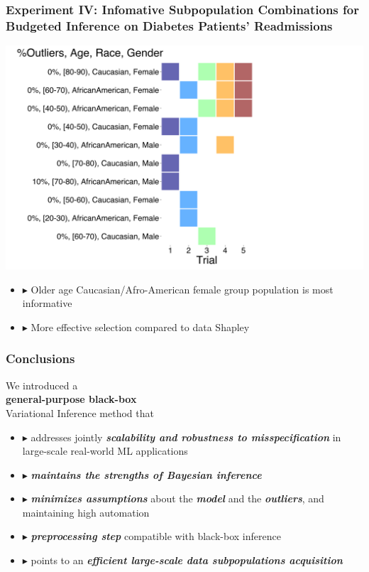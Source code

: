 \documentclass[hyperref={colorlinks = true},unknownkeysallowed]{beamer}
\let\oldcitep=\citep
\renewcommand\citep[1]{\hypersetup{linkcolor=darkred}\hyperlink{#1}{\oldcitep{#1}}}
\begin{document}
\begin{frame}
	\frametitle{Experiment IV: Infomative Subpopulation Combinations for Budgeted Inference on Diabetes Patients' Readmissions}
	\centering
	\includegraphics[width=.49\textwidth]{figs/selected_groups.png}	
	\begin{itemize}
		\item $\blacktriangleright$ Older age Caucasian/Afro-American female group population is most informative ~\citep{ghorbani19}
		\item $\blacktriangleright$ More effective selection compared to data Shapley~\citep{shapley53}
	\end{itemize}
\end{frame}


\begin{frame}
	\frametitle{Conclusions}
	\centering
	We introduced a \\ \textbf{general-purpose  black-box} \\ Variational Inference method that \pause
	\begin{itemize}
		\item $\blacktriangleright$ addresses jointly \emph{\textbf{scalability and robustness to misspecification}} in  large-scale real-world ML applications
		\item $\blacktriangleright$ \emph{\textbf{maintains the strengths of Bayesian inference}}
		\item $\blacktriangleright$ \emph{\textbf{minimizes assumptions}} about the \emph{\textbf{model}} and the \emph{\textbf{outliers}}, and maintaining high automation
		\item $\blacktriangleright$ \emph{\textbf{preprocessing step}} compatible with black-box inference
		\item $\blacktriangleright$ points to an \emph{\textbf{efficient large-scale data subpopulations acquisition}}
	\end{itemize}
\end{frame}
\end{document}
